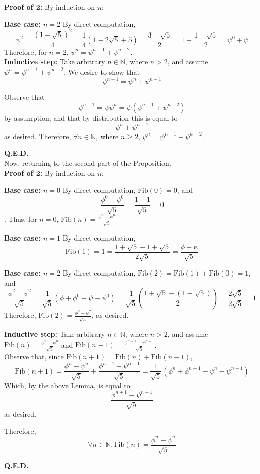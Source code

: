 \documentclass{article}
\begin{document}
\noindent
\textbf{Proof of 2:} By induction on $ n $:

\textbf{Base case: $n = 2$} By direct computation,
$$ \psi^2 = \frac{(1-\sqrt{5})^2}{4} = \frac{1}{4}(1-2\sqrt{5}+5) = \frac{3 - \sqrt{5}}{2} = 1 + \frac{1 - \sqrt{5}}{2} = \psi^0 + \psi $$
Therefore, for $ n = 2 $, $ \psi^n = \psi^{n - 1} + \psi^{n - 2} $. \\

\textbf{Inductive step:} Take arbitrary $ n \in \mathbb{N} $, where $ n > 2 $, and assume $ \psi^n = \psi^{n - 1} + \psi^{n - 2} $. We desire to show that $$ \psi^{n + 1} = \psi^n + \psi^{n - 1} $$

Observe that $$ \psi^{n + 1} = \psi\psi^n = \psi(\psi^{n - 1} + \psi^{n - 2}) $$ by assumption, and that by distribution this is equal to $$ \psi^n + \psi^{n - 1} $$ as desired.
Therefore, $ \forall n \in \mathbb{N} $, where $ n \geq 2 $, $ \psi^n = \psi^{n - 1} + \psi^{n - 2} $.


\hfill \textbf{Q.E.D.} \\


Now, returning to the second part of the Proposition, \\

\noindent
\textbf{Proof of 2:} By induction on $ n $:

\textbf{Base case: $n = 0$} By direct computation,
$ \text{Fib}(0) = 0 $, and $$ \frac{\phi^0 - \psi^0}{\sqrt{5}} = \frac{1 - 1}{\sqrt{5}} = 0 $$.
Thus, for $ n = 0 $, $ \text{Fib}(n) = \frac{\phi^n - \psi^n}{\sqrt{5}} $

\textbf{Base case: $n = 1$} By direct computation,
$$ \text{Fib}(1) = 1 = \frac{1 + \sqrt{5} - 1 + \sqrt{5}}{2\sqrt{5}} = \frac{\phi - \psi}{\sqrt{5}} $$

\textbf{Base case: $n = 2$} By direct computation,
$ \text{Fib}(2) = \text{Fib}(1) + \text{Fib}(0) = 1 $, and $$ \frac{\phi^2 - \psi^2}{\sqrt{5}} = \frac{1}{\sqrt{5}}(\phi + \phi^0 - \psi - \psi^0) = \frac{1}{\sqrt{5}}(\frac{1 + \sqrt{5} - (1 - \sqrt{5})}{2}) = \frac{2\sqrt{5}}{2\sqrt{5}} = 1 $$
Therefore, $ \text{Fib}(2) = \frac{\phi^2 - \psi^2}{\sqrt{5}} $, as desired.


\textbf{Inductive step:} Take arbitrary $ n \in \mathbb{N} $, where $ n > 2 $, and assume $ \text{Fib}(n) = \frac{\phi^n-\psi^n}{\sqrt{5}} $ and $ \text{Fib}(n - 1) = \frac{\phi^{n - 1} - \psi^{n - 1}}{\sqrt{5}} $. \\

Observe that, since $ \text{Fib}(n + 1) = \text{Fib}(n) + \text{Fib}(n - 1) $, $$ \text{Fib}(n + 1) = \frac{\phi^n - \psi^n}{\sqrt{5}} + \frac{\phi^{n - 1} + \psi^{n - 1}}{\sqrt{5}} = \frac{1}{\sqrt{5}}(\phi^n + \phi^{n - 1} - \psi^n - \psi^{n - 1}) $$ Which, by the above Lemma, is equal to $$ \frac{\phi^{n + 1} - \psi^{n - 1}}{\sqrt{5}} $$ as desired.

Therefore, $$ \forall n \in \mathbb{N}, \text{Fib}(n) = \frac{\phi^n - \psi^n}{\sqrt{5}} $$

\hfill \textbf{Q.E.D.} \\
\end{document}
